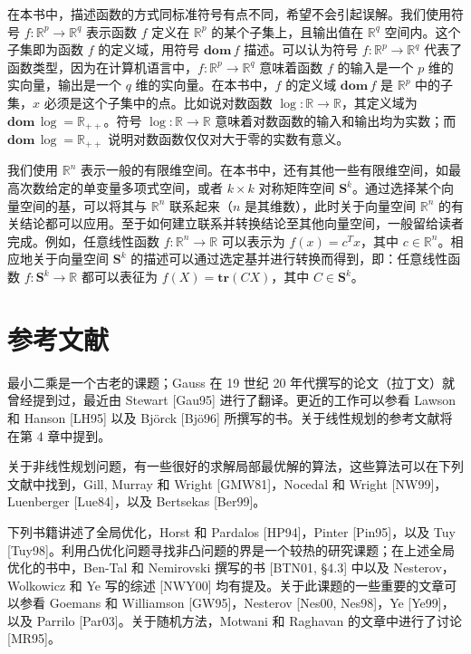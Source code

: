 \documentclass[UTF8,12pt,a4paper,fontset=fandol]{ctexart}
\begin{document}
在本书中，描述函数的方式同标准符号有点不同，希望不会引起误解。我们使用符号 $f:\mathbb{R}^p\to\mathbb{R}^q$ 表示函数 $f$ 定义在 $\mathbb{R}^p$ 的某个子集上，且输出值在 $\mathbb{R}^q$ 空间内。这个子集即为函数 $f$ 的定义域，用符号 $\mathbf{dom}\,f$ 描述。可以认为符号 $f:\mathbb{R}^p\to\mathbb{R}^q$ 代表了函数类型，因为在计算机语言中，$f:\mathbb{R}^p\to\mathbb{R}^q$ 意味着函数 $f$ 的输入是一个 $p$ 维的实向量，输出是一个 $q$ 维的实向量。在本书中，$f$ 的定义域 $\mathbf{dom}\,f$ 是 $\mathbb{R}^p$ 中的子集，$x$ 必须是这个子集中的点。比如说对数函数 $\log:\mathbb{R}\to\mathbb{R}$，其定义域为 $\mathbf{dom}\,\log=\mathbb{R}_{++}$。符号 $\log:\mathbb{R}\to\mathbb{R}$ 意味着对数函数的输入和输出均为实数；而 $\mathbf{dom}\,\log=\mathbb{R}_{++}$ 说明对数函数仅仅对大于零的实数有意义。

我们使用 $\mathbb{R}^n$ 表示一般的有限维空间。在本书中，还有其他一些有限维空间，如最高次数给定的单变量多项式空间，或者 $k\times k$ 对称矩阵空间 $\mathbf{S}^k$。通过选择某个向量空间的基，可以将其与 $\mathbb{R}^n$ 联系起来（$n$ 是其维数），此时关于向量空间 $\mathbb{R}^n$ 的有关结论都可以应用。至于如何建立联系并转换结论至其他向量空间，一般留给读者完成。例如，任意线性函数 $f:\mathbb{R}^n\to\mathbb{R}$ 可以表示为 $f(x)=c^Tx$，其中 $c\in\mathbb{R}^n$。相应地关于向量空间 $\mathbf{S}^k$ 的描述可以通过选定基并进行转换而得到，即：任意线性函数 $f:\mathbf{S}^k\to\mathbb{R}$ 都可以表征为 $f(X)=\mathbf{tr}(CX)$，其中 $C\in\mathbf{S}^k$。

\section*{参考文献}

最小二乘是一个古老的课题；Gauss 在 19 世纪 20 年代撰写的论文（拉丁文）就曾经提到过，最近由 Stewart [Gau95] 进行了翻译。更近的工作可以参看 Lawson 和 Hanson [LH95] 以及 Björck [Bjö96] 所撰写的书。关于线性规划的参考文献将在第 4 章中提到。

关于非线性规划问题，有一些很好的求解局部最优解的算法，这些算法可以在下列文献中找到，Gill, Murray 和 Wright [GMW81]，Nocedal 和 Wright [NW99]，Luenberger [Lue84]，以及 Bertsekas [Ber99]。

下列书籍讲述了全局优化，Horst 和 Pardalos [HP94]，Pinter [Pin95]，以及 Tuy [Tuy98]。利用凸优化问题寻找非凸问题的界是一个较热的研究课题；在上述全局优化的书中，Ben-Tal 和 Nemirovski 撰写的书 [BTN01, §4.3] 中以及 Nesterov，Wolkowicz 和 Ye 写的综述 [NWY00] 均有提及。关于此课题的一些重要的文章可以参看 Goemans 和 Williamson [GW95]，Nesterov [Nes00, Nes98]，Ye [Ye99]，以及 Parrilo [Par03]。关于随机方法，Motwani 和 Raghavan 的文章中进行了讨论 [MR95]。
\end{document}
